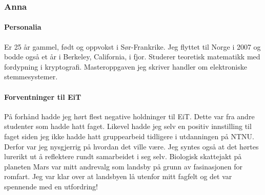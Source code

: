 \subsubsection{Anna}

\paragraph{Personalia}
Er 25 år gammel, født og oppvokst i Sør-Frankrike. Jeg flyttet til Norge i 2007 og bodde også et år i Berkeley, California, i fjor.
Studerer teoretisk matematikk med fordypning i kryptografi. Masteroppgaven jeg skriver handler om elektroniske stemmesystemer.

\paragraph{Forventninger til EiT}
På forhånd hadde jeg hørt flest negative holdninger til EiT.
Dette var fra andre studenter som hadde hatt faget.
Likevel hadde jeg selv en positiv innstilling til faget siden jeg ikke hadde hatt gruppearbeid tidligere i utdanningen på NTNU.
Derfor var jeg nysgjerrig på hvordan det ville være.
Jeg syntes også at det hørtes lurerikt ut å reflektere rundt samarbeidet i seg selv.
Biologisk skattejakt på planeten Mars var mitt andrevalg som landsby på grunn av fasinasjonen for romfart.
Jeg var klar over at landsbyen lå utenfor mitt fagfelt og det var spennende med en utfordring!